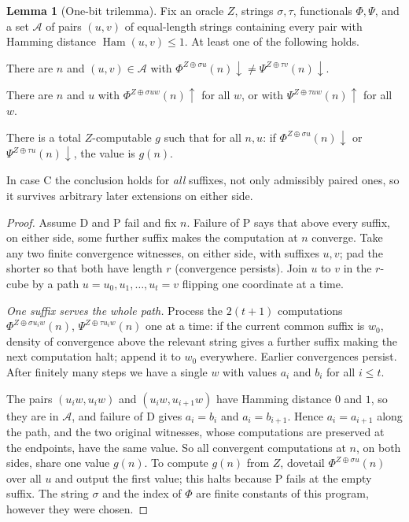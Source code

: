 \documentclass[11pt,letterpaper]{article}
\theoremstyle{definition}
\newtheorem{lemma}[definition]{Lemma}
\numberwithin{equation}{section}
\newcommand{\Ham}{\operatorname{Ham}}
\newcommand{\dn}{{\downarrow}}
\newcommand{\up}{{\uparrow}}
\newcommand{\src}[1]{\leavevmode{\sffamily\footnotesize\color{Steel}[#1]}}
\begin{document}
\begin{lemma}[One-bit trilemma]\label{lem:trilemma}\src{R2, R6, R7}
Fix an oracle $Z$, strings $\sigma,\tau$, functionals $\Phi,\Psi$, and a set $\mathcal A$ of pairs $(u,v)$ of equal-length strings containing every pair with Hamming distance $\Ham(u,v)\le1$. At least one of the following holds.
\begin{description}[leftmargin=1.4em,itemsep=2pt,topsep=2pt]
\item[\textup{D (admissible disagreement)}] There are $n$ and $(u,v)\in\mathcal A$ with $\Phi^{Z\oplus\sigma u}(n)\dn\ne\Psi^{Z\oplus\tau v}(n)\dn$.
\item[\textup{P (partiality cylinder)}] There are $n$ and $u$ with $\Phi^{Z\oplus\sigma uw}(n)\up$ for all $w$, or with $\Psi^{Z\oplus\tau uw}(n)\up$ for all $w$.
\item[\textup{C (computable common output)}] There is a total $Z$-computable $g$ such that for all $n,u$: if $\Phi^{Z\oplus\sigma u}(n)\dn$ or $\Psi^{Z\oplus\tau u}(n)\dn$, the value is $g(n)$.
\end{description}
In case \textup{C} the conclusion holds for \emph{all} suffixes, not only admissibly paired ones, so it survives arbitrary later extensions on either side.
\end{lemma}
\begin{proof}
Assume D and P fail and fix $n$. Failure of P says that above every suffix, on either side, some further suffix makes the computation at $n$ converge. Take any two finite convergence witnesses, on either side, with suffixes $u,v$; pad the shorter so that both have length $r$ (convergence persists). Join $u$ to $v$ in the $r$-cube by a path $u=u_0,u_1,\dots,u_t=v$ flipping one coordinate at a time.

\emph{One suffix serves the whole path.} Process the $2(t+1)$ computations $\Phi^{Z\oplus\sigma u_iw}(n)$, $\Psi^{Z\oplus\tau u_iw}(n)$ one at a time: if the current common suffix is $w_0$, density of convergence above the relevant string gives a further suffix making the next computation halt; append it to $w_0$ everywhere. Earlier convergences persist. After finitely many steps we have a single $w$ with values $a_i$ and $b_i$ for all $i\le t$.

The pairs $(u_iw,u_iw)$ and $(u_iw,u_{i+1}w)$ have Hamming distance $0$ and $1$, so they are in $\mathcal A$, and failure of D gives $a_i=b_i$ and $a_i=b_{i+1}$. Hence $a_i=a_{i+1}$ along the path, and the two original witnesses, whose computations are preserved at the endpoints, have the same value. So all convergent computations at $n$, on both sides, share one value $g(n)$. To compute $g(n)$ from $Z$, dovetail $\Phi^{Z\oplus\sigma u}(n)$ over all $u$ and output the first value; this halts because P fails at the empty suffix. The string $\sigma$ and the index of $\Phi$ are finite constants of this program, however they were chosen.
\end{proof}
\end{document}
